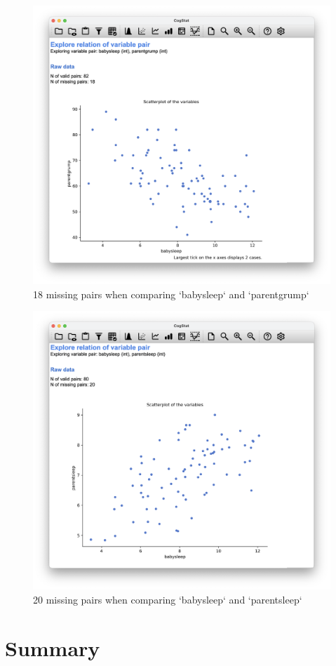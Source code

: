 \documentclass[
  11pt,
  a4paper,
  twoside,symmetric,openright]{book}
\theoremstyle{break}
\theoremstyle{break}
\begin{document}
\begin{figure}

{\centering \includegraphics[width=0.6\linewidth]{resources/image/cogstatbabysleepparentgrumpmissing} 

}

\caption{18 missing pairs when comparing `babysleep` and `parentgrump`}\label{fig:parenthoodmissingcog2}
\end{figure}

\begin{figure}

{\centering \includegraphics[width=0.6\linewidth]{resources/image/cogstatparentsleepbabysleepmissing} 

}

\caption{20 missing pairs when comparing `babysleep` and `parentsleep`}\label{fig:parenthoodmissingcog3}
\end{figure}

\hypertarget{summary-2}{%
\section*{Summary}\label{summary-2}}
\end{document}
